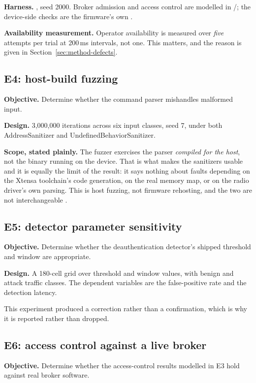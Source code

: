 \textbf{Harness.} , seed 2000. Broker admission and access
control are modelled in /; the device-side checks are the
firmware's own .

\textbf{Availability measurement.} Operator availability is measured over \emph{five} attempts
per trial at 200\,ms intervals, not one. This matters, and the reason is given in
Section~\ref{sec:method-defects}.

\subsection{E4: host-build fuzzing}

\textbf{Objective.} Determine whether the command parser mishandles malformed input.

\textbf{Design.} 3,000,000 iterations across six input classes, seed 7, under both
AddressSanitizer and UndefinedBehaviorSanitizer.

\textbf{Scope, stated plainly.} The fuzzer exercises the parser \emph{compiled for the host},
not the binary running on the device. That is what makes the sanitizers usable and it is equally
the limit of the result: it says nothing about faults depending on the Xtensa toolchain's code
generation, on the real memory map, or on the radio driver's own parsing. This is host fuzzing,
not firmware rehosting, and the two are not interchangeable \cite{pemu2025}.

\subsection{E5: detector parameter sensitivity}

\textbf{Objective.} Determine whether the deauthentication detector's shipped threshold and
window are appropriate.

\textbf{Design.} A 180-cell grid over threshold and window values, with benign and attack
traffic classes. The dependent variables are the false-positive rate and the detection latency.

This experiment produced a correction rather than a confirmation, which is why it is reported
rather than dropped.

\subsection{E6: access control against a live broker}

\textbf{Objective.} Determine whether the access-control results modelled in E3 hold against
real broker software.

